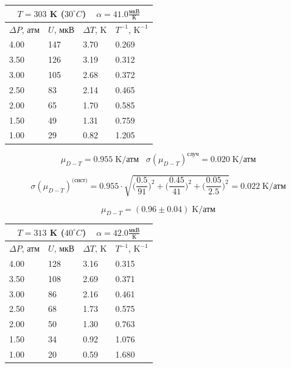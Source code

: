 \documentclass[a4paper, 12pt]{article}
\begin{document}
	\begin{table}[H]
		\centering
		\begin{tabular}{llll}
			\hline
			\multicolumn{4}{c}{$T=303$ K ($30^\circ C$) $ \;\;\; \alpha = 41.0 \frac{\text{мкВ}}{\text{К}} $} \\
			\hline
			$\Delta P$, атм & $U$, мкВ & $\Delta T$, K & $T^{-1}$, $\text{K}^{-1}$ \\ \hline
			4.00 & 147 & 3.70 & 0.269 \\
			3.50 & 126 & 3.19 & 0.312 \\
			3.00 & 105 & 2.68 & 0.372 \\
			2.50 & 83  & 2.14 & 0.465 \\
			2.00 & 65  & 1.70 & 0.585 \\
			1.50 & 49  & 1.31 & 0.759 \\
			1.00 & 29  & 0.82 & 1.205 \\ 			\hline
		\end{tabular}
	\end{table}

	$$ \mu_{D-T} = 0.955 \; \text{K/атм} \;\;\; \sigma(\mu_{D-T})^{\text{случ}} = 0.020 \; \text{K/атм} $$
	
	$$ \sigma(\mu_{D-T})^{ \text{(сист)} } = 0.955 \cdot \sqrt{
		\Big(\frac{0.5}{91}\Big)^2 + 
		\Big(\frac{0.45}{41}\Big)^2 + 
		\Big(\frac{0.05}{2.5}\Big)^2
	} = 0.022 \; \text{K/атм} $$
	
	\begin{equation*}
		\mu_{D-T} = (0.96 \pm 0.04) \; \text{K/атм}
	\end{equation*}

	\begin{table}[H]
		\centering
		\begin{tabular}{llll}
			\hline
			\multicolumn{4}{c}{$T=313$ K ($40^\circ C$) $ \;\;\; \alpha = 42.0 \frac{\text{мкВ}}{\text{К}} $} \\
			\hline
			$\Delta P$, атм & $U$, мкВ & $\Delta T$, K & $T^{-1}$, $\text{K}^{-1}$ \\ \hline
			4.00 & 128 & 3.16 & 0.315 \\
			3.50 & 108 & 2.69 & 0.371 \\
			3.00 & 86  & 2.16 & 0.461 \\
			2.50 & 68  & 1.73 & 0.575 \\
			2.00 & 50  & 1.30 & 0.763 \\
			1.50 & 34  & 0.92 & 1.076 \\
			1.00 & 20  & 0.59 & 1.680 \\				\hline
		\end{tabular}
	\end{table}
\end{document}
